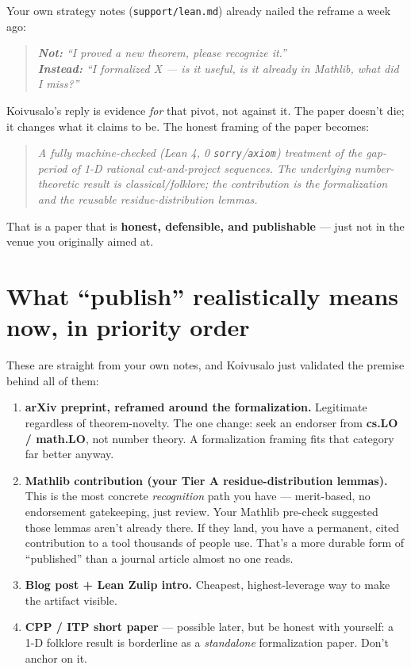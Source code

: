 \documentclass[11pt,a4paper]{article}
\newenvironment{quotebox}
  {\begin{quote}\itshape\color{black!70}}
  {\end{quote}}
\begin{document}
Your own strategy notes (\texttt{support/lean.md}) already nailed the reframe a
week ago:

\begin{quotebox}
\textbf{Not:} ``I proved a new theorem, please recognize it.''\\
\textbf{Instead:} ``I formalized X --- is it useful, is it already in Mathlib,
what did I miss?''
\end{quotebox}

Koivusalo's reply is evidence \emph{for} that pivot, not against it. The paper
doesn't die; it changes what it claims to be. The honest framing of the paper
becomes:

\begin{quotebox}
A fully machine-checked (Lean 4, 0 \texttt{sorry}/\texttt{axiom}) treatment of
the gap-period of 1-D rational cut-and-project sequences. The underlying
number-theoretic result is classical/folklore; the contribution is the
formalization and the reusable residue-distribution lemmas.
\end{quotebox}

That is a paper that is \textbf{honest, defensible, and publishable} --- just
not in the venue you originally aimed at.

\section*{What ``publish'' realistically means now, in priority order}

These are straight from your own notes, and Koivusalo just validated the
premise behind all of them:

\begin{enumerate}[leftmargin=*]
  \item \textbf{arXiv preprint, reframed around the formalization.} Legitimate
  regardless of theorem-novelty. The one change: seek an endorser from
  \textbf{cs.LO / math.LO}, not number theory. A formalization framing fits
  that category far better anyway.

  \item \textbf{Mathlib contribution (your Tier A residue-distribution
  lemmas).} This is the most concrete \emph{recognition} path you have ---
  merit-based, no endorsement gatekeeping, just review. Your Mathlib pre-check
  suggested those lemmas aren't already there. If they land, you have a
  permanent, cited contribution to a tool thousands of people use. That's a
  more durable form of ``published'' than a journal article almost no one
  reads.

  \item \textbf{Blog post + Lean Zulip intro.} Cheapest, highest-leverage way
  to make the artifact visible.

  \item \textbf{CPP / ITP short paper} --- possible later, but be honest with
  yourself: a 1-D folklore result is borderline as a \emph{standalone}
  formalization paper. Don't anchor on it.
\end{enumerate}
\end{document}
